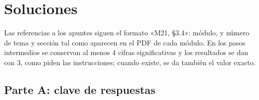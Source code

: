 \chapter{Soluciones}
\label{ap:soluciones}

Las referencias a los apuntes siguen el formato «M21, §3.4»: módulo, y número de tema y sección tal como aparecen en el PDF de cada módulo. En los pasos intermedios se conservan al menos 4 cifras significativas y los resultados se dan con 3, como piden las instrucciones; cuando existe, se da también el valor exacto.

\section{Parte A: clave de respuestas}

